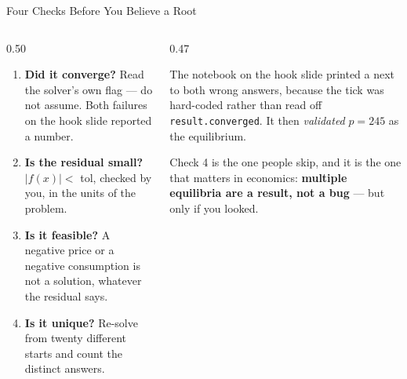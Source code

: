\begin{frame}{Four Checks Before You Believe a Root}
\begin{columns}[T]
\begin{column}{0.50\textwidth}
\small
\begin{enumerate}\footnotesize
  \item \textbf{Did it converge?} Read the solver's own flag --- do not assume. Both failures on the hook slide reported a number.
  \item \textbf{Is the residual small?} $|f(x)|<$ tol, checked by you, in the units of the problem.
  \item \textbf{Is it feasible?} A negative price or a negative consumption is not a solution, whatever the residual says.
  \item \textbf{Is it unique?} Re-solve from twenty different starts and count the distinct answers.
\end{enumerate}
\end{column}
\begin{column}{0.47\textwidth}
\begin{cautionbox}[title=\textbf{The failure mode to know}]\footnotesize
The notebook on the hook slide printed a \texttt{\checkmark} next to both wrong answers, because the tick was hard-coded rather than read off \texttt{result.converged}. It then \emph{validated} $p=245$ as the equilibrium.
\end{cautionbox}
\medskip
\begin{takeawaybox}\footnotesize
Check 4 is the one people skip, and it is the one that matters in economics: \textbf{multiple equilibria are a result, not a bug} --- but only if you looked.
\end{takeawaybox}
\end{column}
\end{columns}
\vspace{1mm}
\end{frame}

